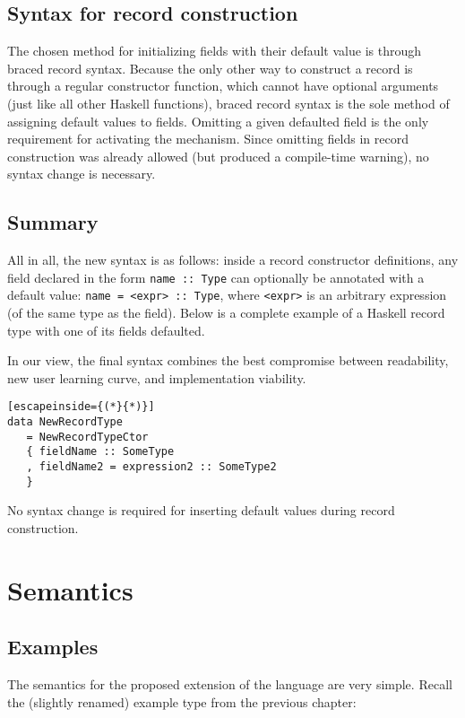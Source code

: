 \documentclass[en]{pracamgr}
\newcommand{\code}[1]{\lstinline[breaklines=true]{#1}}
\begin{document}
\section{Syntax for record construction}

The chosen method for initializing fields with their default value is through braced record syntax.
Because the only other way to construct a record is through a regular constructor function, which cannot have optional arguments (just like all other Haskell functions), braced record syntax is the sole method of assigning default values to fields.
Omitting a given defaulted field is the only requirement for activating the mechanism. 
Since omitting fields in record construction was already allowed (but produced a compile-time warning), no syntax change is necessary.

\section{Summary}
All in all, the new syntax is as follows: inside a record constructor definitions, any field declared in the form \code{name :: Type}
can optionally be annotated with a default value: \code{name = <expr> :: Type}, 
where \code{<expr>} is an arbitrary expression (of the same type as the field).
Below is a complete example of a Haskell record type with one of its fields defaulted. 

In our view, the final syntax combines the best compromise between readability, new user learning curve, and implementation viability.

\begin{lstlisting}[escapeinside={(*}{*)}]
data NewRecordType
   = NewRecordTypeCtor 
   { fieldName :: SomeType 
   , fieldName2 = expression2 :: SomeType2
   }
\end{lstlisting}

No syntax change is required for inserting default values during record construction.

\chapter{Semantics}\label{ch:sem}
\section{Examples}
The semantics for the proposed extension of the language are very simple.
Recall the (slightly renamed) example type from the previous chapter:
\end{document}
